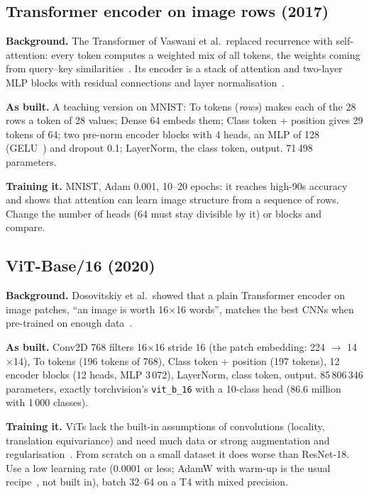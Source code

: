 \documentclass[11pt,a4paper]{article}
\begin{document}
\subsection{Transformer encoder on image rows (2017)}
\textbf{Background.} The Transformer of Vaswani et al.\ replaced recurrence with self-attention: every token computes a weighted mix of
all tokens, the weights coming from query--key similarities~\cite{vaswani2017attention}. Its encoder is a stack of attention and
two-layer MLP blocks with residual connections and layer normalisation~\cite{ba2016layernorm}.

\textbf{As built.} A teaching version on MNIST: To tokens (\emph{rows}) makes each of the 28 rows a token of 28 values; Dense 64 embeds
them; Class token + position gives 29 tokens of 64; two pre-norm encoder blocks with 4 heads, an MLP of 128 (GELU~\cite{hendrycks2016gelu})
and dropout 0.1; LayerNorm, the class token, output. 71\,498 parameters.

\textbf{Training it.} MNIST, Adam 0.001, 10--20 epochs: it reaches high-90s accuracy and shows that attention can learn image structure
from a sequence of rows. Change the number of heads (64 must stay divisible by it) or blocks and compare.

\subsection{ViT-Base/16 (2020)}
\textbf{Background.} Dosovitskiy et al.\ showed that a plain Transformer encoder on image patches, ``an image is worth 16$\times$16
words'', matches the best CNNs when pre-trained on enough data~\cite{dosovitskiy2020vit}.

\textbf{As built.} Conv2D 768 filters 16$\times$16 stride 16 (the patch embedding: 224 $\rightarrow$ 14$\times$14), To tokens (196 tokens
of 768), Class token + position (197 tokens), 12 encoder blocks (12 heads, MLP 3\,072), LayerNorm, class token, output.
85\,806\,346 parameters, exactly torchvision's \texttt{vit\_b\_16} with a 10-class head (86.6 million with 1\,000 classes).

\textbf{Training it.} ViTs lack the built-in assumptions of convolutions (locality, translation equivariance) and need much data or strong
augmentation and regularisation~\cite{steiner2021howtotrain,touvron2020deit}. From scratch on a small dataset it does worse than
ResNet-18. Use a low learning rate (0.0001 or less; AdamW with warm-up is the usual recipe~\cite{loshchilov2017adamw,goyal2017accurate},
not built in), batch 32--64 on a T4 with mixed precision.
\end{document}
